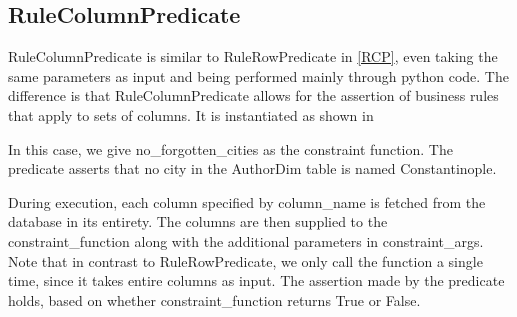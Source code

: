 \subsection{RuleColumnPredicate}
RuleColumnPredicate is similar to RuleRowPredicate in \cref{RCP}, even taking the same parameters as input and being performed mainly through python code. The difference is that RuleColumnPredicate allows for the assertion of business rules that apply to sets of columns. It is instantiated as shown in 


In this case, we give no\_forgotten\_cities as the constraint function. The predicate asserts that no city in the AuthorDim table is named Constantinople.

During execution, each column specified by column\_name is fetched from the database in its entirety. The columns are then supplied to the constraint\_function along with the additional parameters in constraint\_args. Note that in contrast to RuleRowPredicate, we only call the function a single time, since it takes entire columns as input. The assertion made by the predicate holds, based on whether constraint\_function returns True or False.